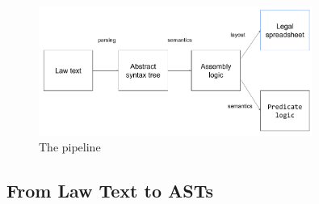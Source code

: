 \documentclass{IOS-Book-Article}
\begin{document}
\begin{figure}[h!]
    \includegraphics[width=0.8\textwidth]{pipeline.png}
\caption{The pipeline}
\label{pipeline}
\end{figure}





\subsection{From Law Text to ASTs}
\label{sec:2.2}
\end{document}
